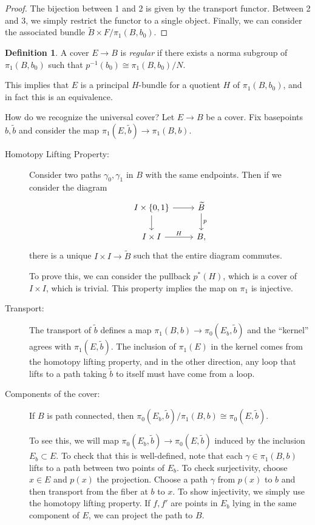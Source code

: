 \documentclass[leqno, openany]{memoir}
\theoremstyle{definition}
\newtheorem{defn}[thm]{Definition}
\theoremstyle{remark}
\theoremstyle{plain}
\theoremstyle{definition}
\theoremstyle{remark}
\newcommand{\wt}[1]{\widetilde{#1}}
\begin{document}
\begin{proof}
    The bijection between 1 and 2 is given by the transport functor. Between 2 and 3, we simply restrict the functor to a single object. Finally, we can consider the associated bundle $\wt{B} \times F / \pi_1(B,b_0)$.
\end{proof}

\begin{defn}
    A cover $E \to B$ is \textit{regular} if there exists a norma subgroup of $\pi_1(B,b_0)$ such that $p^{-1}(b_0) \cong \pi_1(B,b_0) / N$.
\end{defn}

This implies that $E$ is a principal $H$-bundle for a quotient $H$ of $\pi_1(B,b_0)$, and in fact this is an equivalence.

How do we recognize the universal cover? Let $E \to B$ be a cover. Fix basepoints $b, \wt{b}$ and consider the map $\pi_1(E, \wt{b}) \to \pi_1(B,b)$. 
\begin{description}
    \item[Homotopy Lifting Property:] Consider two paths $\gamma_0, \gamma_1$ in $B$ with the same endpoints. Then if we consider the diagram
        \begin{equation}
        \begin{tikzcd}
            I \times \{ 0,1 \} \arrow{r} \arrow{d} & \wt{B} \arrow{d}{p} \\
            I \times I \arrow{r}{H} & B,
        \end{tikzcd}
        \end{equation}
        there is a unique $I \times I \to \wt{B}$ such that the entire diagram commutes.

        To prove this, we can consider the pullback $p^*(H)$, which is a cover of $I \times I$, which is trivial. This property implies the map on $\pi_1$ is injective.
    \item[Transport:] The transport of $\wt{b}$ defines a map $\pi_1(B,b) \to \pi_0(E_b, \wt{b})$ and the ``kernel'' agrees with $\pi_1(E, \wt{b})$. The inclusion of $\pi_1(E)$ in the kernel comes from the homotopy lifting property, and in the other direction, any loop that lifts to a path taking $\wt{b}$ to itself must have come from a loop.
    \item[Components of the cover:] If $B$ is path connected, then $\pi_0(E_b,\wt{b}) / \pi_1(B,b) \cong \pi_0(E,\wt{b})$.

        To see this, we will map $\pi_0(E_b, \wt{b}) \to \pi_0(E, \wt{b})$ induced by the inclusion $E_b \subset E$. To check that this is well-defined, note that each $\gamma \in \pi_1(B,b)$ lifts to a path between two points of $E_b$. To check surjectivity, choose $x \in E$ and $p(x)$ the projection. Choose a path $\gamma$ from $p(x)$ to $b$ and then transport from the fiber at $b$ to $x$. To show injectivity, we simply use the homotopy lifting property. If $f, f'$ are points in $E_b$ lying in the same component of $E$, we can project the path to $B$.
\end{description}
\end{document}

